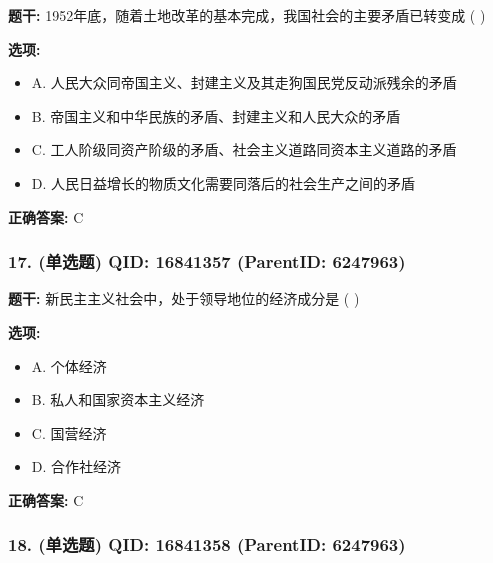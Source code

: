 \documentclass[12pt,UTF8]{ctexart}
\begin{document}
\textbf{题干:}
1952年底，随着土地改革的基本完成，我国社会的主要矛盾已转变成 ( )



\textbf{选项:}
\begin{itemize}[leftmargin=*]

  \item A. 人民大众同帝国主义、封建主义及其走狗国民党反动派残余的矛盾

  \item B. 帝国主义和中华民族的矛盾、封建主义和人民大众的矛盾

  \item C. 工人阶级同资产阶级的矛盾、社会主义道路同资本主义道路的矛盾

  \item D. 人民日益增长的物质文化需要同落后的社会生产之间的矛盾

\end{itemize}

\textbf{正确答案:}
C

\vspace{0.3em}\hrulefill\vspace{0.7em}

\subsubsection*{17. (单选题) \small QID: 16841357 (ParentID: 6247963)}

\textbf{题干:}
新民主主义社会中，处于领导地位的经济成分是 ( )



\textbf{选项:}
\begin{itemize}[leftmargin=*]

  \item A. 个体经济

  \item B. 私人和国家资本主义经济

  \item C. 国营经济

  \item D. 合作社经济

\end{itemize}

\textbf{正确答案:}
C

\vspace{0.3em}\hrulefill\vspace{0.7em}

\subsubsection*{18. (单选题) \small QID: 16841358 (ParentID: 6247963)}
\end{document}
